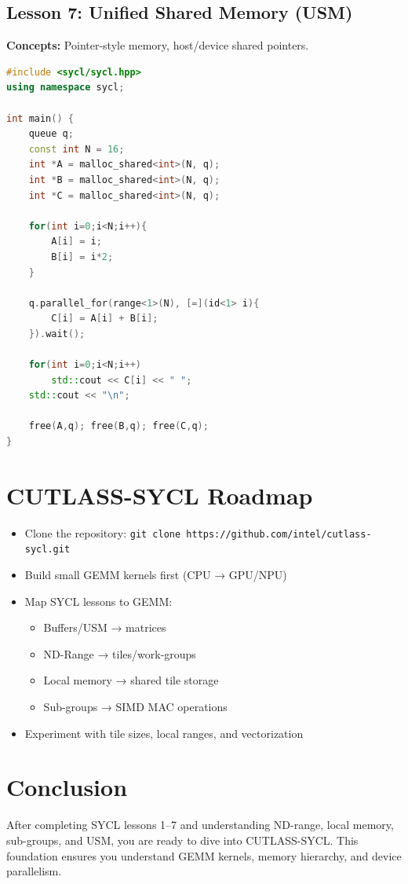 \documentclass[a4paper,12pt]{article}
\begin{document}
\subsection{Lesson 7: Unified Shared Memory (USM)}
\textbf{Concepts:} Pointer-style memory, host/device shared pointers.

\begin{lstlisting}[language=C++]
#include <sycl/sycl.hpp>
using namespace sycl;

int main() {
    queue q;
    const int N = 16;
    int *A = malloc_shared<int>(N, q);
    int *B = malloc_shared<int>(N, q);
    int *C = malloc_shared<int>(N, q);

    for(int i=0;i<N;i++){
        A[i] = i;
        B[i] = i*2;
    }

    q.parallel_for(range<1>(N), [=](id<1> i){
        C[i] = A[i] + B[i];
    }).wait();

    for(int i=0;i<N;i++)
        std::cout << C[i] << " ";
    std::cout << "\n";

    free(A,q); free(B,q); free(C,q);
}
\end{lstlisting}

\section{CUTLASS-SYCL Roadmap}
\begin{itemize}
    \item Clone the repository: \texttt{git clone https://github.com/intel/cutlass-sycl.git}
    \item Build small GEMM kernels first (CPU → GPU/NPU)
    \item Map SYCL lessons to GEMM:
    \begin{itemize}
        \item Buffers/USM → matrices
        \item ND-Range → tiles/work-groups
        \item Local memory → shared tile storage
        \item Sub-groups → SIMD MAC operations
    \end{itemize}
    \item Experiment with tile sizes, local ranges, and vectorization
\end{itemize}

\section{Conclusion}
After completing SYCL lessons 1–7 and understanding ND-range, local memory, sub-groups, and USM, you are ready to dive into CUTLASS-SYCL. This foundation ensures you understand GEMM kernels, memory hierarchy, and device parallelism.
\end{document}
